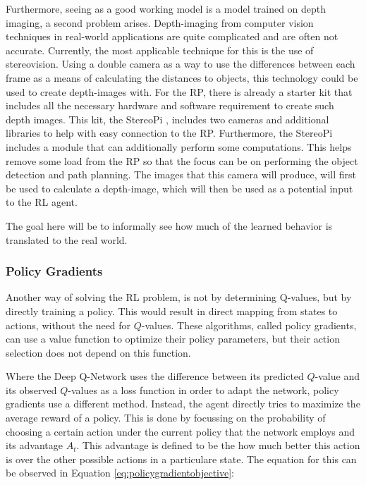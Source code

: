 Furthermore, seeing as a good working model is a model trained on depth imaging, a second 
problem arises. Depth-imaging from computer vision techniques in real-world applications are 
quite complicated and are often not accurate. Currently, the most applicable technique for this 
is the use of stereovision. Using a double camera as a way to use the differences between 
each frame as a means of calculating the distances to objects, this technology could be used 
to create depth-images with. For the RP, there is already a starter kit that includes 
all the necessary hardware and software requirement to create such depth images. This 
kit, the StereoPi \cite{StereoPi}, includes two cameras and additional libraries to 
help with easy connection to the RP. Furthermore, the StereoPi includes a module that 
can additionally perform some computations. This helps remove some load from the 
RP so that the focus can be on performing the object detection and path planning.
The images that this camera will produce, will first be used to calculate a depth-image,
which will then be used as a potential input to the RL agent. 

The goal here will be to informally see how much of the learned behavior is translated to the
real world. 


\subsubsection{Policy Gradients}
Another way of solving the RL problem, is not by determining Q-values, but by directly 
training a policy. This would result in direct mapping from states to actions, without 
the need for $Q$-values. These 
algorithms, called policy gradients, can use a value function to optimize their policy 
parameters, but their action selection does not depend on this function.

Where the Deep Q-Network uses the difference between its predicted $Q$-value and its observed 
$Q$-values as a loss function in order to adapt the network, policy gradients use a different 
method. Instead, the agent directly tries to maximize the average reward of a policy. This is 
done by focussing on the probability of choosing a certain action under the current policy 
that the network employs and its advantage $A_{t}$. This advantage is defined to be the 
how much better this action is over the other possible actions in a particulare state. 
The equation for this can be observed in Equation \ref{eq:policygradientobjective}:

